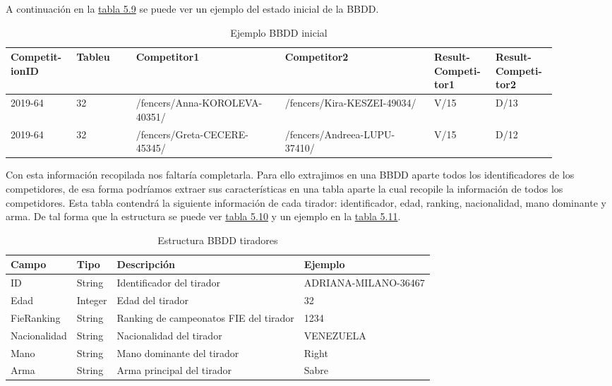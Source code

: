 A continuación en la \hyperref[tab:Ejemplo BBDD inicial iteracion5]{tabla 5.9} se puede ver un ejemplo del estado inicial de la \acs{BBDD}.

\begin{longtable}[]{|p{0.1\linewidth} p{0.1\linewidth} p{0.25\linewidth} p{0.25\linewidth} p{0.1\linewidth} p{0.1\linewidth}|}
  \caption{Ejemplo \acs{BBDD} inicial}
  \label{tab:Ejemplo BBDD inicial iteracion5}

  \endfirsthead
  \endhead

  \hline \rowcolor[HTML]{C0C0C0}
  Competit-ionID & Tableu & Competitor1 & Competitor2 & Result-Competi-tor1 & Result-Competi-tor2 \\ \hline
  2019-64 & 32 & /fencers/Anna-KOROLEVA-40351/ & /fencers/Kira-KESZEI-49034/ & V/15 & D/13 \\ \hline
  2019-64 & 32 & /fencers/Greta-CECERE-45345/ & /fencers/Andreea-LUPU-37410/ & V/15 & D/12 \\ \hline
\end{longtable}

\newpage

Con esta información recopilada nos faltaría completarla. Para ello extrajimos en una \acs{BBDD}
aparte todos los identificadores de los competidores, de esa forma podríamos extraer
sus características en una tabla aparte la cual recopile la información de todos
los competidores. Esta tabla contendrá la siguiente información de cada tirador:
identificador, edad, ranking, nacionalidad, mano dominante y arma. De tal forma
que la estructura se puede ver \hyperref[tab:Estructura BBDD tiradores]{tabla 5.10} y un ejemplo en la \hyperref[tab:Ejemplo BBDD tiradores]{tabla 5.11}.

\begin{table}[]
  \centering
  \caption{Estructura \acs{BBDD} tiradores}
  \label{tab:Estructura BBDD tiradores}
  \begin{tabular}{|llll|}
    \hline \rowcolor[HTML]{C0C0C0}
    Campo & Tipo & Descripción & Ejemplo \\ \hline
    ID & String & Identificador del tirador & ADRIANA-MILANO-36467 \\ \hline
    Edad & Integer & Edad del tirador & 32 \\ \hline
    FieRanking & String & Ranking de campeonatos \acs{FIE} del tirador & 1234 \\ \hline
    Nacionalidad & String & Nacionalidad del tirador & VENEZUELA \\ \hline
    Mano & String & Mano dominante del tirador & Right \\ \hline
    Arma & String & Arma principal del tirador & Sabre \\ \hline
  \end{tabular}
\end{table}

